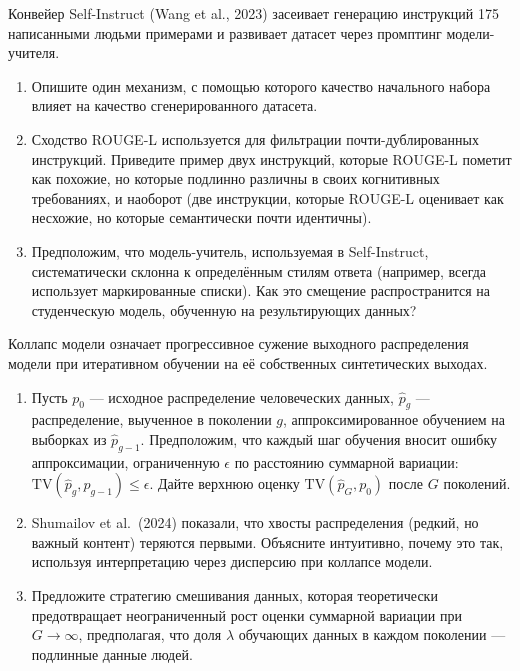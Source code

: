 \begin{exercise}
\label{ex:self-instruct}
Конвейер Self-Instruct (Wang et al., 2023) засеивает генерацию инструкций 175 написанными людьми примерами и развивает датасет через промптинг модели-учителя.
\begin{enumerate}
  \item Опишите один механизм, с помощью которого качество начального набора влияет на качество сгенерированного датасета.
  \item Сходство ROUGE-L используется для фильтрации почти-дублированных инструкций. Приведите пример двух инструкций, которые ROUGE-L пометит как похожие, но которые подлинно различны в своих когнитивных требованиях, и наоборот (две инструкции, которые ROUGE-L оценивает как несхожие, но которые семантически почти идентичны).
  \item Предположим, что модель-учитель, используемая в Self-Instruct, систематически склонна к определённым стилям ответа (например, всегда использует маркированные списки). Как это смещение распространится на студенческую модель, обученную на результирующих данных?
\end{enumerate}
\end{exercise}

\begin{exercise}
\label{ex:model-collapse}
Коллапс модели означает прогрессивное сужение выходного распределения модели при итеративном обучении на её собственных синтетических выходах.
\begin{enumerate}
  \item Пусть $p_0$ --- исходное распределение человеческих данных, $\hat{p}_g$ --- распределение, выученное в поколении $g$, аппроксимированное обучением на выборках из $\hat{p}_{g-1}$. Предположим, что каждый шаг обучения вносит ошибку аппроксимации, ограниченную $\epsilon$ по расстоянию суммарной вариации: $\mathrm{TV}(\hat{p}_g, p_{g-1}) \leq \epsilon$. Дайте верхнюю оценку $\mathrm{TV}(\hat{p}_G, p_0)$ после $G$ поколений.
  \item Shumailov et al.\ (2024) показали, что хвосты распределения (редкий, но важный контент) теряются первыми. Объясните интуитивно, почему это так, используя интерпретацию через дисперсию при коллапсе модели.
  \item Предложите стратегию смешивания данных, которая теоретически предотвращает неограниченный рост оценки суммарной вариации при $G \to \infty$, предполагая, что доля $\lambda$ обучающих данных в каждом поколении --- подлинные данные людей.
\end{enumerate}
\end{exercise}

